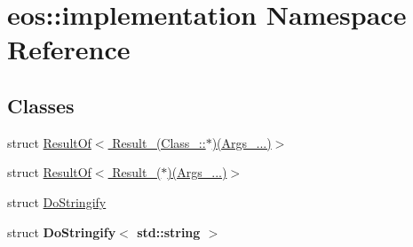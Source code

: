 \hypertarget{namespaceeos_1_1implementation}{
\section{eos::implementation Namespace Reference}
\label{namespaceeos_1_1implementation}
}
\subsection*{Classes}
\begin{DoxyCompactItemize}
\item 
struct \hyperlink{structeos_1_1implementation_1_1ResultOf_3_01Result___07Class___1_1_5_08_07Args___8_8_8_08_4}{ResultOf$<$ Result\_\-(Class\_\-::$\ast$)(Args\_\-...)$>$}
\item 
struct \hyperlink{structeos_1_1implementation_1_1ResultOf_3_01Result___07_5_08_07Args___8_8_8_08_4}{ResultOf$<$ Result\_\-($\ast$)(Args\_\-...)$>$}
\item 
struct \hyperlink{structeos_1_1implementation_1_1DoStringify}{DoStringify}
\item 
struct {\bfseries DoStringify$<$ std::string $>$}
\end{DoxyCompactItemize}
